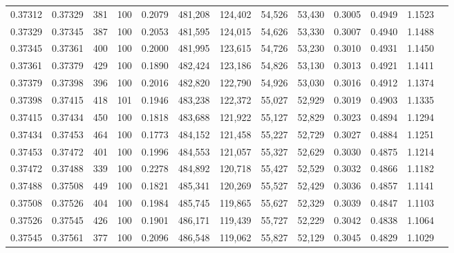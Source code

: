 \begin{tabular}{rrrrrrrrrrrrr}
0.37312 & 0.37329 &   381 & 100 &                                     0.2079 & 481,208 & 124,402 &  54,526 &  53,430 & 0.3005 & 0.4949 & 1.1523 \\
0.37329 & 0.37345 &   387 & 100 &                                     0.2053 & 481,595 & 124,015 &  54,626 &  53,330 & 0.3007 & 0.4940 & 1.1488 \\
0.37345 & 0.37361 &   400 & 100 &                                     0.2000 & 481,995 & 123,615 &  54,726 &  53,230 & 0.3010 & 0.4931 & 1.1450 \\
0.37361 & 0.37379 &   429 & 100 &                                     0.1890 & 482,424 & 123,186 &  54,826 &  53,130 & 0.3013 & 0.4921 & 1.1411 \\
0.37379 & 0.37398 &   396 & 100 &                                     0.2016 & 482,820 & 122,790 &  54,926 &  53,030 & 0.3016 & 0.4912 & 1.1374 \\
0.37398 & 0.37415 &   418 & 101 &                                     0.1946 & 483,238 & 122,372 &  55,027 &  52,929 & 0.3019 & 0.4903 & 1.1335 \\
0.37415 & 0.37434 &   450 & 100 &                                     0.1818 & 483,688 & 121,922 &  55,127 &  52,829 & 0.3023 & 0.4894 & 1.1294 \\
0.37434 & 0.37453 &   464 & 100 &                                     0.1773 & 484,152 & 121,458 &  55,227 &  52,729 & 0.3027 & 0.4884 & 1.1251 \\
0.37453 & 0.37472 &   401 & 100 &                                     0.1996 & 484,553 & 121,057 &  55,327 &  52,629 & 0.3030 & 0.4875 & 1.1214 \\
0.37472 & 0.37488 &   339 & 100 &                                     0.2278 & 484,892 & 120,718 &  55,427 &  52,529 & 0.3032 & 0.4866 & 1.1182 \\
0.37488 & 0.37508 &   449 & 100 &                                     0.1821 & 485,341 & 120,269 &  55,527 &  52,429 & 0.3036 & 0.4857 & 1.1141 \\
0.37508 & 0.37526 &   404 & 100 &                                     0.1984 & 485,745 & 119,865 &  55,627 &  52,329 & 0.3039 & 0.4847 & 1.1103 \\
0.37526 & 0.37545 &   426 & 100 &                                     0.1901 & 486,171 & 119,439 &  55,727 &  52,229 & 0.3042 & 0.4838 & 1.1064 \\
0.37545 & 0.37561 &   377 & 100 &                                     0.2096 & 486,548 & 119,062 &  55,827 &  52,129 & 0.3045 & 0.4829 & 1.1029 \\

\end{tabular}
